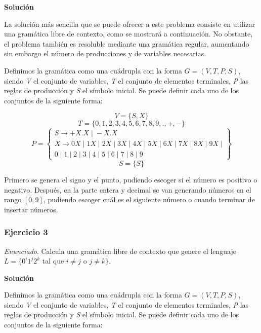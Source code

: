 \documentclass[11pt,a4paper]{article}
\newcommand{\enu}{\textit{Enunciado}}
\newcommand{\sol}{\textbf{Solución}}
\begin{document}
		\sol \par
		La solución más sencilla que se puede ofrecer a este problema consiste en utilizar una gramática
		libre de contexto, como se mostrará a continuación. No obstante, el problema también es resoluble
		mediante una gramática regular, aumentando sin embargo el número de producciones y de variables
		necesarias. \par
		
		Definimos la gramática como una cuádrupla con la forma $G = (V, T, P, S)$, siendo \textit{V} el conjunto
		de variables, \textit{T} el conjunto de elementos terminales, \textit{P} las reglas de producción y
		\textit{S} el símbolo inicial. Se puede definir cada uno de los conjuntos de la siguiente forma: \par
		
		\[V = \lbrace S, X \rbrace \]
		\[T = \lbrace 0, 1, 2, 3, 4, 5, 6, 7, 8, 9, ., +, -\rbrace \]
		\[P = \left\{\begin{array}{c}
    			S \rightarrow +X.X \; | \; -X.X \\
    			X \rightarrow 0X \; | \; 1X \; | \; 2X \; | \; 3X \; | \; 4X \; | \; 5X \; | \;
    			6X \; | \; 7X \; | \; 8X \; | \; 9X \; | \\ 
    			0 \; | \; 1 \; | \; 2 \; | \; 3 \; | \; 4 \; | \; 5 \; | \; 6 \; | \;
    			7 \; | \; 8 \; | \; 9
  			\end{array}\right\}
		\]
		\[S = \lbrace S \rbrace \]
		
		Primero se genera el signo y el punto, pudiendo escoger si el número es positivo o negativo. Después,
		en la parte entera y decimal se van generando números en el rango $[0, 9]$, pudiendo escoger cuál es
		el siguiente número o cuando terminar de insertar números.
				 
		
		\subsubsection{Ejercicio 3}
		\enu. Calcula una gramática libre de contexto que genere el lenguaje
		$L = \lbrace 0^i 1^j 2^k$
		tal que
		$i \neq j$ o $j \neq k \rbrace$. \par
		
		\sol \par
		
		Definimos la gramática como una cuádrupla con la forma $G = (V, T, P, S)$, siendo \textit{V} el conjunto
		de variables, \textit{T} el conjunto de elementos terminales, \textit{P} las reglas de producción y
		\textit{S} el símbolo inicial. Se puede definir cada uno de los conjuntos de la siguiente forma: \par
		
\end{document}
